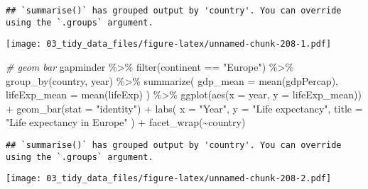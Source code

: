 \documentclass[
]{book}
\newenvironment{Shaded}{\begin{snugshade}}{\end{snugshade}}
\newcommand{\AttributeTok}[1]{\textcolor[rgb]{0.77,0.63,0.00}{#1}}
\newcommand{\CommentTok}[1]{\textcolor[rgb]{0.56,0.35,0.01}{\textit{#1}}}
\newcommand{\FunctionTok}[1]{\textcolor[rgb]{0.00,0.00,0.00}{#1}}
\newcommand{\NormalTok}[1]{#1}
\newcommand{\SpecialCharTok}[1]{\textcolor[rgb]{0.00,0.00,0.00}{#1}}
\newcommand{\StringTok}[1]{\textcolor[rgb]{0.31,0.60,0.02}{#1}}
\begin{document}
\begin{verbatim}
## `summarise()` has grouped output by 'country'. You can override using the `.groups` argument.
\end{verbatim}

\texttt{[image: 03\_tidy\_data\_files/figure-latex/unnamed-chunk-208-1.pdf]}

\begin{Shaded}
\begin{Highlighting}[]
\CommentTok{\# geom bar}
\NormalTok{gapminder }\SpecialCharTok{\%\textgreater{}\%}
  \FunctionTok{filter}\NormalTok{(continent }\SpecialCharTok{==} \StringTok{"Europe"}\NormalTok{) }\SpecialCharTok{\%\textgreater{}\%}
  \FunctionTok{group\_by}\NormalTok{(country, year) }\SpecialCharTok{\%\textgreater{}\%}
  \FunctionTok{summarize}\NormalTok{(}
    \AttributeTok{gdp\_mean =} \FunctionTok{mean}\NormalTok{(gdpPercap),}
    \AttributeTok{lifeExp\_mean =} \FunctionTok{mean}\NormalTok{(lifeExp)}
\NormalTok{  ) }\SpecialCharTok{\%\textgreater{}\%}
  \FunctionTok{ggplot}\NormalTok{(}\FunctionTok{aes}\NormalTok{(}\AttributeTok{x =}\NormalTok{ year, }\AttributeTok{y =}\NormalTok{ lifeExp\_mean)) }\SpecialCharTok{+}
  \FunctionTok{geom\_bar}\NormalTok{(}\AttributeTok{stat =} \StringTok{"identity"}\NormalTok{) }\SpecialCharTok{+}
  \FunctionTok{labs}\NormalTok{(}
    \AttributeTok{x =} \StringTok{"Year"}\NormalTok{,}
    \AttributeTok{y =} \StringTok{"Life expectancy"}\NormalTok{,}
    \AttributeTok{title =} \StringTok{"Life expectancy in Europe"}
\NormalTok{  ) }\SpecialCharTok{+}
  \FunctionTok{facet\_wrap}\NormalTok{(}\SpecialCharTok{\textasciitilde{}}\NormalTok{country)}
\end{Highlighting}
\end{Shaded}

\begin{verbatim}
## `summarise()` has grouped output by 'country'. You can override using the `.groups` argument.
\end{verbatim}

\texttt{[image: 03\_tidy\_data\_files/figure-latex/unnamed-chunk-208-2.pdf]}
\end{document}
